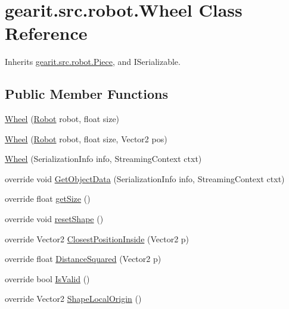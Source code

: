 \hypertarget{classgearit_1_1src_1_1robot_1_1_wheel}{\section{gearit.\+src.\+robot.\+Wheel Class Reference}
\label{classgearit_1_1src_1_1robot_1_1_wheel}
}


Inherits \hyperlink{classgearit_1_1src_1_1robot_1_1_piece}{gearit.\+src.\+robot.\+Piece}, and I\+Serializable.

\subsection*{Public Member Functions}
\begin{DoxyCompactItemize}
\item 
\hyperlink{classgearit_1_1src_1_1robot_1_1_wheel_ac37202de84091296a16ef6338331b99e}{Wheel} (\hyperlink{classgearit_1_1src_1_1robot_1_1_robot}{Robot} robot, float size)
\item 
\hyperlink{classgearit_1_1src_1_1robot_1_1_wheel_a137a89fbe00f37c6507767cce4d2c8bc}{Wheel} (\hyperlink{classgearit_1_1src_1_1robot_1_1_robot}{Robot} robot, float size, Vector2 pos)
\item 
\hyperlink{classgearit_1_1src_1_1robot_1_1_wheel_a84b5c3c068f5c47f09f9958eb0d18e01}{Wheel} (Serialization\+Info info, Streaming\+Context ctxt)
\item 
override void \hyperlink{classgearit_1_1src_1_1robot_1_1_wheel_ad80d4ab25ce754ea965fd281500a3f85}{Get\+Object\+Data} (Serialization\+Info info, Streaming\+Context ctxt)
\item 
override float \hyperlink{classgearit_1_1src_1_1robot_1_1_wheel_a53187a3061ac473ea26bde10b17c5609}{get\+Size} ()
\item 
override void \hyperlink{classgearit_1_1src_1_1robot_1_1_wheel_ae75e8069a811803d95c10ea05aaad609}{reset\+Shape} ()
\item 
override Vector2 \hyperlink{classgearit_1_1src_1_1robot_1_1_wheel_af846d9609aa1c7a178fc3b5f622df206}{Closest\+Position\+Inside} (Vector2 p)
\item 
override float \hyperlink{classgearit_1_1src_1_1robot_1_1_wheel_aab527883ae40529f44ad9d7207f249a4}{Distance\+Squared} (Vector2 p)
\item 
override bool \hyperlink{classgearit_1_1src_1_1robot_1_1_wheel_a1cd59fa76d80d4a66ee587950d823a39}{Is\+Valid} ()
\item 
override Vector2 \hyperlink{classgearit_1_1src_1_1robot_1_1_wheel_a967c20594697bf89f33a381d2698443b}{Shape\+Local\+Origin} ()
\end{DoxyCompactItemize}
